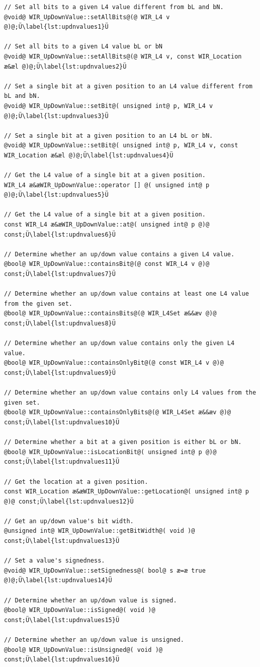 \begin{lstlisting}[style=code,float=!t,caption={Value Handling of Class \texttt{WIR\_UpDownValue}},label=lst:updnvalues]
// Set all bits to a given L4 value different from bL and bN.
@void@ WIR_UpDownValue::setAllBits@(@ WIR_L4 v @)@;Ü\label{lst:updnvalues1}Ü

// Set all bits to a given L4 value bL or bN
@void@ WIR_UpDownValue::setAllBits@(@ WIR_L4 v, const WIR_Location æ&æl @)@;Ü\label{lst:updnvalues2}Ü

// Set a single bit at a given position to an L4 value different from bL and bN.
@void@ WIR_UpDownValue::setBit@( unsigned int@ p, WIR_L4 v @)@;Ü\label{lst:updnvalues3}Ü

// Set a single bit at a given position to an L4 bL or bN.
@void@ WIR_UpDownValue::setBit@( unsigned int@ p, WIR_L4 v, const WIR_Location æ&æl @)@;Ü\label{lst:updnvalues4}Ü

// Get the L4 value of a single bit at a given position.
WIR_L4 æ&æWIR_UpDownValue::operator [] @( unsigned int@ p @)@;Ü\label{lst:updnvalues5}Ü

// Get the L4 value of a single bit at a given position.
const WIR_L4 æ&æWIR_UpDownValue::at@( unsigned int@ p @)@ const;Ü\label{lst:updnvalues6}Ü

// Determine whether an up/down value contains a given L4 value.
@bool@ WIR_UpDownValue::containsBit@(@ const WIR_L4 v @)@ const;Ü\label{lst:updnvalues7}Ü

// Determine whether an up/down value contains at least one L4 value from the given set.
@bool@ WIR_UpDownValue::containsBits@(@ WIR_L4Set æ&&æv @)@ const;Ü\label{lst:updnvalues8}Ü

// Determine whether an up/down value contains only the given L4 value.
@bool@ WIR_UpDownValue::containsOnlyBit@(@ const WIR_L4 v @)@ const;Ü\label{lst:updnvalues9}Ü

// Determine whether an up/down value contains only L4 values from the given set.
@bool@ WIR_UpDownValue::containsOnlyBits@(@ WIR_L4Set æ&&æv @)@ const;Ü\label{lst:updnvalues10}Ü

// Determine whether a bit at a given position is either bL or bN.
@bool@ WIR_UpDownValue::isLocationBit@( unsigned int@ p @)@ const;Ü\label{lst:updnvalues11}Ü

// Get the location at a given position.
const WIR_Location æ&æWIR_UpDownValue::getLocation@( unsigned int@ p @)@ const;Ü\label{lst:updnvalues12}Ü

// Get an up/down value's bit width.
@unsigned int@ WIR_UpDownValue::getBitWidth@( void )@ const;Ü\label{lst:updnvalues13}Ü

// Set a value's signedness.
@void@ WIR_UpDownValue::setSignedness@( bool@ s æ=æ true @)@;Ü\label{lst:updnvalues14}Ü

// Determine whether an up/down value is signed.
@bool@ WIR_UpDownValue::isSigned@( void )@ const;Ü\label{lst:updnvalues15}Ü

// Determine whether an up/down value is unsigned.
@bool@ WIR_UpDownValue::isUnsigned@( void )@ const;Ü\label{lst:updnvalues16}Ü
\end{lstlisting}

